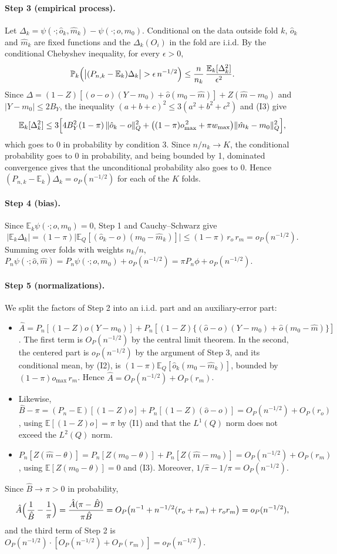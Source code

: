 \documentclass[11pt,a4paper]{article}
\newcommand{\E}{\mathbb{E}}
\newcommand{\PP}{\mathbb{P}}
\theoremstyle{plain}
\theoremstyle{definition}
\begin{document}
\paragraph{Step 3 (empirical process).} Let $\Delta_k=\psi(\cdot;\hat o_k,\hat m_k)-\psi(\cdot;o,m_0)$. Conditional on the data outside fold $k$, $\hat o_k$ and $\hat m_k$ are fixed functions and the $\Delta_k(O_i)$ in the fold are i.i.d. By the conditional Chebyshev inequality, for every $\epsilon>0$,
\[
\PP_k\Bigl(\bigl|(P_{n,k}-\E_k)\Delta_k\bigr|>\epsilon\,n^{-1/2}\Bigr)\le\frac{n}{n_k}\,\frac{\E_k[\Delta_k^2]}{\epsilon^2}.
\]
Since $\Delta=(1-Z)[(\hat o-o)(Y-m_0)+\hat o(m_0-\hat m)]+Z(\hat m-m_0)$ and $|Y-m_0|\le2B_Y$, the inequality $(a+b+c)^2\le3(a^2+b^2+c^2)$ and (I3) give
\[
\E_k[\Delta_k^2]\le3\Bigl[4B_Y^2(1-\pi)\,\|\hat o_k-o\|_Q^2+\bigl((1-\pi)o_{\max}^{\,2}+\pi w_{\max}\bigr)\|\hat m_k-m_0\|_Q^2\Bigr],
\]
which goes to 0 in probability by condition 3. Since $n/n_k\to K$, the conditional probability goes to 0 in probability, and being bounded by 1, dominated convergence gives that the unconditional probability also goes to 0. Hence $(P_{n,k}-\E_k)\Delta_k=o_P(n^{-1/2})$ for each of the $K$ folds.

\paragraph{Step 4 (bias).} Since $\E_k\psi(\cdot;o,m_0)=0$, Step 1 and Cauchy--Schwarz give
\[
|\E_k\Delta_k|=(1-\pi)\bigl|\E_Q[(\hat o_k-o)(m_0-\hat m_k)]\bigr|\le(1-\pi)\,r_o\,r_m=o_P(n^{-1/2}).
\]
Summing over folds with weights $n_k/n$, $P_n\psi(\cdot;\hat o,\hat m)=P_n\psi(\cdot;o,m_0)+o_P(n^{-1/2})=\pi P_n\phi+o_P(n^{-1/2})$.

\paragraph{Step 5 (normalizations).} We split the factors of Step 2 into an i.i.d. part and an auxiliary-error part:
\begin{itemize}
  \item $\hat A=P_n[(1-Z)o(Y-m_0)]+P_n[(1-Z)\{(\hat o-o)(Y-m_0)+\hat o(m_0-\hat m)\}]$. The first term is $O_P(n^{-1/2})$ by the central limit theorem. In the second, the centered part is $o_P(n^{-1/2})$ by the argument of Step 3, and its conditional mean, by (I2), is $(1-\pi)\E_Q[\hat o_k(m_0-\hat m_k)]$, bounded by $(1-\pi)o_{\max}\,r_m$. Hence $\hat A=O_P(n^{-1/2})+O_P(r_m)$.
  \item Likewise, $\hat B-\pi=(P_n-\E)[(1-Z)o]+P_n[(1-Z)(\hat o-o)]=O_P(n^{-1/2})+O_P(r_o)$, using $\E[(1-Z)o]=\pi$ by (I1) and that the $L^1(Q)$ norm does not exceed the $L^2(Q)$ norm.
  \item $P_n[Z(\hat m-\theta)]=P_n[Z(m_0-\theta)]+P_n[Z(\hat m-m_0)]=O_P(n^{-1/2})+O_P(r_m)$, using $\E[Z(m_0-\theta)]=0$ and (I3). Moreover, $1/\hat\pi-1/\pi=O_P(n^{-1/2})$.
\end{itemize}
Since $\hat B\to\pi>0$ in probability,
\[
\hat A\Bigl(\frac1{\hat B}-\frac1\pi\Bigr)=\frac{\hat A(\pi-\hat B)}{\pi\hat B}=O_P\bigl(n^{-1}+n^{-1/2}(r_o+r_m)+r_or_m\bigr)=o_P(n^{-1/2}),
\]
and the third term of Step 2 is $O_P(n^{-1/2})\cdot[O_P(n^{-1/2})+O_P(r_m)]=o_P(n^{-1/2})$.
\end{document}
